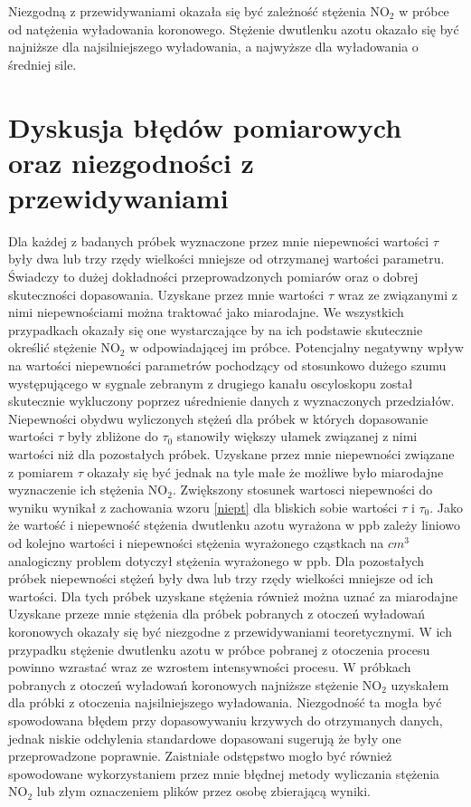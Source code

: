 \documentclass[10pt,a4paper]{article}
\begin{document}
Niezgodną z przewidywaniami okazała się być zależność stężenia $\text{NO}_{\text{2}}$ w próbce od natężenia wyładowania koronowego. Stężenie dwutlenku azotu okazało się być najniższe dla najsilniejszego wyładowania, a najwyższe dla wyładowania o średniej sile.

\section{Dyskusja błędów pomiarowych oraz niezgodności z przewidywaniami}
Dla każdej z badanych próbek wyznaczone przez mnie niepewności wartości $\tau$ były dwa lub trzy rzędy wielkości mniejsze od otrzymanej wartości parametru. Świadczy to dużej dokładności przeprowadzonych pomiarów oraz o dobrej skuteczności dopasowania. Uzyskane przez mnie wartości $\tau$ wraz ze związanymi z nimi niepewnościami można traktować jako miarodajne. We wszystkich przypadkach okazały się one wystarczające by na ich podstawie skutecznie określić stężenie $\text{NO}_{\text{2}}$ w odpowiadającej im próbce. Potencjalny negatywny wpływ na wartości niepewności parametrów pochodzący od stosunkowo dużego szumu występującego w sygnale zebranym z drugiego kanału oscyloskopu został skutecznie wykluczony poprzez uśrednienie danych z wyznaczonych przedziałów.
Niepewności obydwu wyliczonych stężeń dla próbek w których dopasowanie wartości $\tau$ były zbliżone do $\tau_0$ stanowiły większy ułamek związanej z nimi wartości niż dla pozostałych próbek. Uzyskane przez mnie niepewności związane z pomiarem $\tau$ okazały się być jednak na tyle małe że możliwe było miarodajne wyznaczenie ich stężenia $\text{NO}_{\text{2}}$.  Zwiększony stosunek wartosci niepewności do wyniku wynikał z zachowania wzoru \ref{niept}  dla bliskich sobie wartości $\tau$ i $\tau_0$.  Jako że wartość  i niepewność stężenia dwutlenku azotu wyrażona w ppb zależy liniowo od kolejno wartości i niepewności  stężenia wyrażonego cząstkach na $cm^3$ analogiczny problem dotyczył stężenia wyrażonego w ppb.
Dla pozostałych próbek niepewności stężeń były dwa lub trzy rzędy wielkości mniejsze od ich wartości. Dla tych próbek uzyskane stężenia również można uznać za miarodajne
Uzyskane przeze mnie stężenia dla próbek pobranych z otoczeń wyładowań koronowych okazały się być niezgodne z przewidywaniami teoretycznymi. W ich przypadku stężenie dwutlenku azotu w próbce pobranej z otoczenia procesu powinno wzrastać wraz ze wzrostem intensywności procesu. W próbkach pobranych z otoczeń wyładowań koronowych najniższe stężenie $\text{NO}_{\text{2}}$ uzyskałem dla próbki z otoczenia najsilniejszego wyładowania. Niezgodność ta mogła być spowodowana błędem przy dopasowywaniu krzywych do otrzymanych danych, jednak niskie odchylenia standardowe dopasowani sugerują że były one przeprowadzone poprawnie. Zaistniałe odstępstwo mogło być również spowodowane wykorzystaniem przez mnie błędnej metody wyliczania stężenia $\text{NO}_{\text{2}}$ lub złym oznaczeniem plików przez osobę zbierającą wyniki. 
\end{document}
